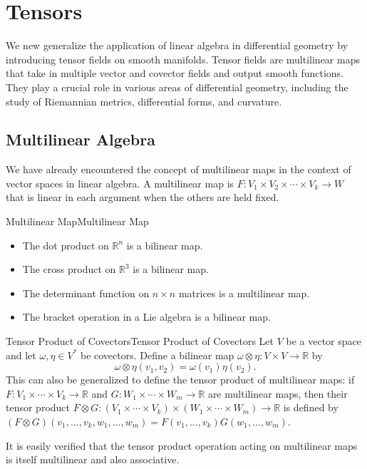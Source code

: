 \documentclass[../main.tex]{subfiles}
\begin{document}
\chapter{Tensors}

We new generalize the application of linear algebra in differential geometry by introducing tensor fields on smooth manifolds. Tensor fields are multilinear maps that take in multiple vector and covector fields and output smooth functions. They play a crucial role in various areas of differential geometry, including the study of Riemannian metrics, differential forms, and curvature.

\section{Multilinear Algebra}
We have already encountered the concept of multilinear maps in the context of vector spaces in linear algebra. A multilinear map is $F: V_1 \times V_2 \times \cdots \times V_k \to W$ that is linear in each argument when the others are held fixed.

\begin{example}{Multilinear Map}{Multilinear Map}
  \begin{itemize}
    \item The dot product on $\mathbb{R}^n$ is a bilinear map.
    \item The cross product on $\mathbb{R}^3$ is a bilinear map.
    \item The determinant function on $n \times n$ matrices is a multilinear map.
    \item The bracket operation in a Lie algebra is a bilinear map.
  \end{itemize}
\end{example}

\begin{example}{Tensor Product of Covectors}{Tensor Product of Covectors}
  Let $V$ be a vector space and let $\omega, \eta \in V^*$ be covectors. Define a bilinear map $\omega \otimes \eta: V \times V \to \mathbb{R}$ by
  \begin{equation}
    \omega \otimes \eta (v_1, v_2) = \omega(v_1) \eta(v_2).
  \end{equation}
  This can also be generalized to define the tensor product of multilinear maps: if $F: V_1 \times \cdots \times V_k \to \mathbb{R}$ and $G: W_1 \times \cdots \times W_m \to \mathbb{R}$ are multilinear maps, then their tensor product $F \otimes G: (V_1 \times \cdots \times V_k) \times (W_1 \times \cdots \times W_m) \to \mathbb{R}$ is defined by $(F \otimes G)(v_1, \ldots, v_k, w_1, \ldots, w_m) = F(v_1, \ldots, v_k) G(w_1, \ldots, w_m)$.

  It is easily verified that the tensor product operation acting on multilinear maps is itself multilinear and also associative.
\end{example}
\end{document}
